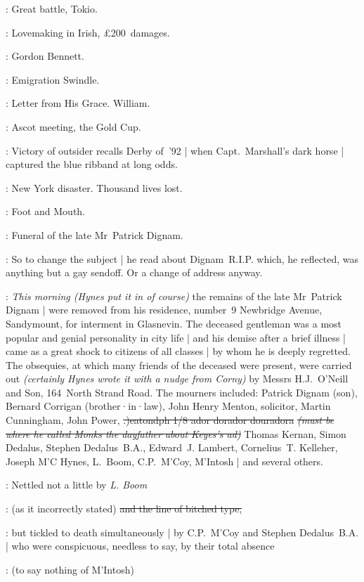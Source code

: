 :
Great battle,
Tokio.

:
Lovemaking in Irish,
£200~damages.

:
Gordon Bennett.

:
Emigration Swindle.

:
Letter from His Grace.
William.

:
Ascot meeting,
the Gold Cup.

:
Victory of outsider  recalls Derby of~'92 |
when Capt.\ Marshall's dark horse  |
captured the blue ribband at long odds.

:
New York disaster.
Thousand lives lost.

:
Foot and Mouth.

:
Funeral of the late Mr~Patrick Dignam.

:
So to change the subject |
he read about Dignam~R.I.P.
which,
he reflected,
was anything but a gay sendoff.
Or a change of address anyway.

\Bloom:
\emph{This morning
(Hynes put it in of course)}
the remains of the late Mr~Patrick Dignam |
were removed from his residence,
number~9 Newbridge Avenue,
Sandymount,
for interment in Glasnevin.%
The deceased gentleman was a most popular and genial personality in city life |
and his demise after a brief illness |
came as a great shock to citizens of all classes |
by whom he is deeply regretted.
The obsequies,
at which many friends of the deceased were present,
were carried out
\emph{(certainly Hynes wrote it with a nudge from Corny)}
by Messrs H.J.~O'Neill and Son,
164~North Strand Road.
The mourners included: Patrick Dignam (son),
Bernard Corrigan (brother·in·law),
John Henry Menton, solicitor,
Martin Cunningham,
John Power,
\sout{.)eatondph 1/8 ador dorador douradora}
\sout{\emph{(must be where he called Monks the dayfather about Keyes's ad)}}
Thomas Kernan,
Simon Dedalus,
Stephen Dedalus~B.A.,
Edward~J. Lambert,
Cornelius~T. Kelleher,
Joseph M'C Hynes,
L.~Boom,
C.P.~M'Coy,
M'Intosh |
and several others.

:
Nettled not a little by \emph{L. Boom}

:
(as it incorrectly stated)
\sout{and the line of bitched type,}

:
but tickled to death simultaneously |
by C.P.~M'Coy and Stephen Dedalus~B.A. |
who were conspicuous,
needless to say,
by their total absence

:
(to say nothing of M'Intosh)

